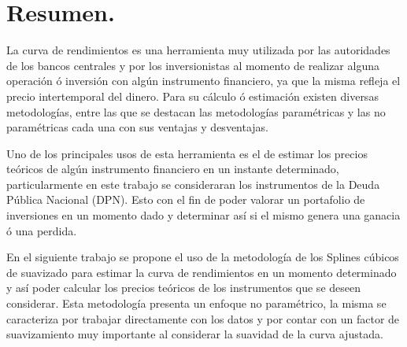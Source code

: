 \chapter*{Resumen.}

\hspace{0.4cm} La curva de rendimientos es una herramienta muy utilizada por las autoridades de los bancos centrales y por los inversionistas al momento de realizar alguna operaci\'on \'o inversi\'on con alg\'un instrumento financiero, ya que la misma refleja el precio intertemporal del dinero. Para su c\'alculo \'o estimaci\'on existen diversas metodolog\'ias, entre las que se destacan las metodolog\'ias param\'etricas y las no param\'etricas cada una con sus ventajas y desventajas.

\hspace{0.4cm} Uno de los principales usos de esta herramienta es el de estimar los precios te\'oricos de alg\'un instrumento financiero en un instante determinado, particularmente en este trabajo se consideraran los instrumentos de la Deuda P\'ublica Nacional (DPN). Esto con el fin de poder valorar un portafolio de inversiones en un momento dado y determinar as\'i si el mismo genera una ganacia \'o una perdida.

\hspace{0.4cm} En el siguiente trabajo se propone el uso de la metodolog\'ia de los Splines c\'ubicos de suavizado para estimar la curva de rendimientos en un momento determinado y as\'i poder calcular los precios te\'oricos de los instrumentos que se deseen considerar. Esta metodolog\'ia presenta un enfoque no param\'etrico, la misma se caracteriza por trabajar directamente con los datos y por contar con un factor de suavizamiento muy importante al considerar la suavidad de la curva ajustada. 



